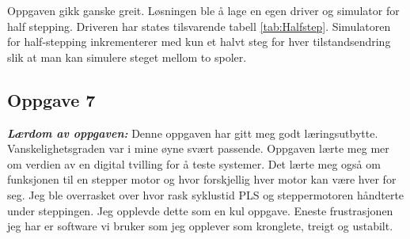 Oppgaven gikk ganske greit. Løsningen ble å lage en egen driver og simulator for half stepping. Driveren har states tilsvarende tabell \ref{tab:Halfstep}. Simulatoren for half-stepping inkrementerer med kun et halvt steg for hver tilstandsendring slik at man kan simulere steget mellom to spoler.

\subsection{Oppgave 7}
\textbf{\textit{Lærdom av oppgaven:}}
\newline
Denne oppgaven har gitt meg godt læringsutbytte. Vanskelighetsgraden var i mine øyne svært passende. Oppgaven lærte meg mer om verdien av en digital tvilling for å teste systemer. Det lærte meg også om funksjonen til en stepper motor og hvor forskjellig hver motor kan være hver for seg. Jeg ble overrasket over hvor rask syklustid PLS og steppermotoren håndterte under steppingen. Jeg opplevde dette som en kul oppgave. Eneste frustrasjonen jeg har er software vi bruker som jeg opplever som kronglete, treigt og ustabilt.